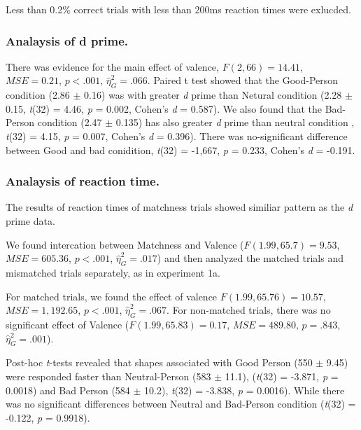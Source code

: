 \documentclass[man]{apa6}
\begin{document}
Less than 0.2\% correct trials with less than 200ms reaction times were exlucded.

\hypertarget{analaysis-of-d-prime.-2}{%
\subsubsection{Analaysis of d prime.}\label{analaysis-of-d-prime.-2}}

There was evidence for the main effect of valence, \(F(2, 66) = 14.41\), \(\mathit{MSE} = 0.21\), \(p < .001\), \(\hat{\eta}^2_G = .066\). Paired t test showed that the Good-Person condition (2.86 \(\pm\) 0.16) was with greater \emph{d} prime than Netural condition (2.28 \(\pm\) 0.15, \emph{t}(32) = 4.46, \emph{p} = 0.002, Cohen's \emph{d} = 0.587). We also found that the Bad-Person condition (2.47 \(\pm\) 0.135) has also greater \emph{d} prime than neutral condition , \emph{t}(32) = 4.15, \emph{p} = 0.007, Cohen's \emph{d} = 0.396). There was no-significant difference between Good and bad conidition, \emph{t}(32) = -1,667, \emph{p} = 0.233, Cohen's \emph{d} = -0.191.

\hypertarget{analaysis-of-reaction-time.-2}{%
\subsubsection{Analaysis of reaction time.}\label{analaysis-of-reaction-time.-2}}

The results of reaction times of matchness trials showed similiar pattern as the \emph{d} prime data.

We found intercation between Matchness and Valence (\(F(1.99, 65.7) = 9.53\), \(\mathit{MSE} = 605.36\), \(p < .001\), \(\hat{\eta}^2_G = .017\)) and then analyzed the matched trials and mismatched trials separately, as in experiment 1a.

For matched trials, we found the effect of valence \(F(1.99, 65.76) = 10.57\), \(\mathit{MSE} = 1,192.65\), \(p < .001\), \(\hat{\eta}^2_G = .067\). For non-matched trials, there was no significant effect of Valence (\(F(1.99, 65.83) = 0.17\), \(\mathit{MSE} = 489.80\), \(p = .843\), \(\hat{\eta}^2_G = .001\)).

Post-hoc \emph{t}-tests revealed that shapes associated with Good Person (550 \(\pm\) 9.45) were responded faster than Neutral-Person (583 \(\pm\) 11.1), (\emph{t}(32) = -3.871, \emph{p} = 0.0018) and Bad Person (584 \(\pm\) 10.2), \emph{t}(32) = -3.838, \emph{p} = 0.0016). While there was no significant differences between Neutral and Bad-Person condition (\emph{t}(32) = -0.122, \emph{p} = 0.9918).
\end{document}
